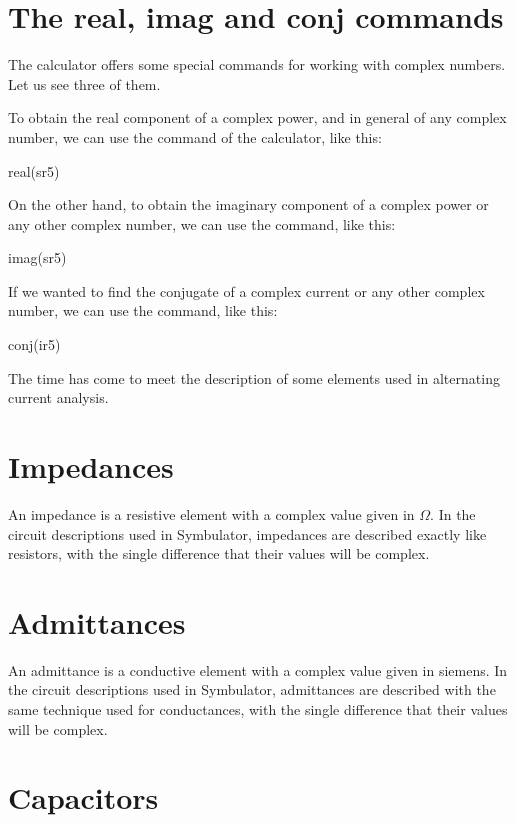 \section{The real, imag and conj commands}

The calculator offers some special commands for working with complex
numbers. Let us see three of them.

To obtain the real component of a complex power, and in general of
any complex number, we can use the  command of the
calculator, like this:

\begin{entry}
real(sr5)
\end{entry}

On the other hand, to obtain the imaginary component of a complex
power or any other complex number, we can use the 
command, like this:

\begin{entry}
imag(sr5)
\end{entry}

If we wanted to find the conjugate of a complex current or any other
complex number, we can use the  command, like this:

\begin{entry}
conj(ir5)
\end{entry}

The time has come to meet the description of some elements used in
alternating current analysis.

\section{Impedances}

An impedance is a resistive element with a complex value given in
$\Omega$. In the circuit descriptions used in Symbulator, impedances
are described exactly like resistors, with the single difference
that their values will be complex.

\section{Admittances}

An admittance is a conductive element with a complex value given in
siemens. In the circuit descriptions used in Symbulator, admittances
are described with the same technique used for conductances, with
the single difference that their values will be complex.

\section{Capacitors}

